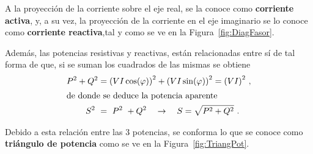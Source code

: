             \noindent A la proyección de la corriente sobre el eje real, se la conoce como 
            \textbf{corriente activa}, y, a su vez, la proyección de la corriente en el eje 
            imaginario se lo conoce como \textbf{corriente reactiva},tal y como se ve en la 
            Figura~\ref{fig:DiagFasor}. 

            Además, las potencias resistivas y reactivas, están relacionadas entre sí de 
            tal forma de que, si se suman los cuadrados de las mismas se obtiene
               \begin{align}
                 P^{2} + Q^{2} &=  {(V I \cos(\varphi))}^2 + {(V I \sin(\varphi))}^2 = {(V I)}^2 \ , \notag \\
                  \intertext{de donde se deduce la potencia aparente}
                     S^{2}\ &=\ P^{2}\ + Q^{2} \hspace{10pt} \rightarrow \hspace{10pt} S = \sqrt{P^{2} + Q^{2}} \ . \notag
               \end{align}
            
            Debido a esta relación entre las 3 potencias, se conforma lo que se conoce como 
            \textbf{triángulo de potencia} como se ve en la Figura~\ref{fig:TriangPot}.

